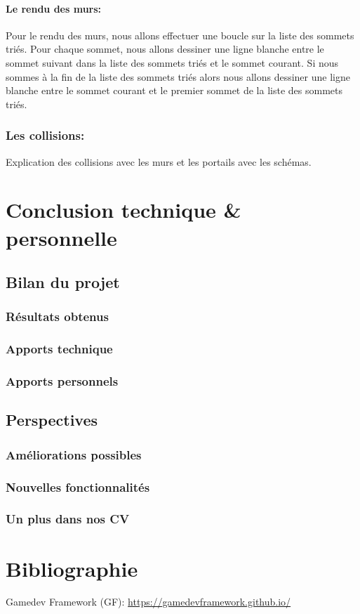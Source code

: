 \documentclass[12pt]{report}
\begin{document}
\paragraph{Le rendu des murs:}
Pour le rendu des murs, nous allons effectuer une boucle sur la liste des sommets
triés. Pour chaque sommet, nous allons dessiner une ligne blanche entre le sommet
suivant dans la liste des sommets triés et le sommet courant. Si nous sommes à
la fin de la liste des sommets triés alors nous allons dessiner une ligne blanche
entre le sommet courant et le premier sommet de la liste des sommets triés.

\subsubsection{Les collisions:}

Explication des collisions avec les murs et les portails avec les schémas.


\section{Conclusion technique \& personnelle}
\subsection{Bilan du projet}
\subsubsection{Résultats obtenus}
\subsubsection{Apports technique}
\subsubsection{Apports personnels}

\subsection{Perspectives}
\subsubsection{Améliorations possibles}
\subsubsection{Nouvelles fonctionnalités}
\subsubsection{Un plus dans nos CV}

\section{Bibliographie}

Gamedev Framework (GF): \href{https://gamedevframework.github.io/}{https://gamedevframework.github.io/}
\end{document}
